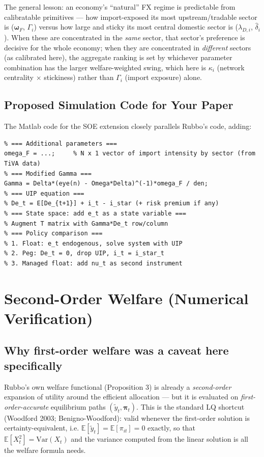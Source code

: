 \documentclass[12pt]{article}
\begin{document}
\begin{insight}
The general lesson: an economy's ``natural'' FX regime is predictable from calibratable primitives --- how import-exposed its most upstream/tradable sector is ($\bm\omega_F$, $\Gamma_i$) versus how large and sticky its most central domestic sector is ($\lambda_{D,i}$, $\hat\delta_i$). When these are concentrated in the \emph{same} sector, that sector's preference is decisive for the whole economy; when they are concentrated in \emph{different} sectors (as calibrated here), the aggregate ranking is set by whichever parameter combination has the larger welfare-weighted swing, which here is $\kappa_i$ (network centrality $\times$ stickiness) rather than $\Gamma_i$ (import exposure) alone.
\end{insight}

\subsection{Proposed Simulation Code for Your Paper}

The Matlab code for the SOE extension closely parallels Rubbo's code, adding:

\begin{verbatim}
% === Additional parameters ===
omega_F = ...;     % N x 1 vector of import intensity by sector (from TiVA data)
% === Modified Gamma ===
Gamma = Delta*(eye(n) - Omega*Delta)^(-1)*omega_F / den;
% === UIP equation ===
% De_t = E[De_{t+1}] + i_t - i_star (+ risk premium if any)
% === State space: add e_t as a state variable ===
% Augment T matrix with Gamma*De_t row/column
% === Policy comparison ===
% 1. Float: e_t endogenous, solve system with UIP
% 2. Peg: De_t = 0, drop UIP, i_t = i_star_t
% 3. Managed float: add nu_t as second instrument
\end{verbatim}

\section{Second-Order Welfare (Numerical Verification)}
\label{sec:second_order}

\subsection{Why first-order welfare was a caveat here specifically}

Rubbo's own welfare functional (Proposition 3) is already a \emph{second-order} expansion of utility around the efficient allocation --- but it is evaluated on \emph{first-order-accurate} equilibrium paths $(\tilde{y}_t, \bm{\pi}_t)$. This is the standard LQ shortcut (Woodford 2003; Benigno-Woodford): valid whenever the first-order solution is certainty-equivalent, i.e. $\mathbb{E}[\tilde{y}_t]=\mathbb{E}[\pi_{it}]=0$ exactly, so that $\mathbb{E}[X_t^2]=\mathrm{Var}(X_t)$ and the variance computed from the linear solution is all the welfare formula needs.
\end{document}
